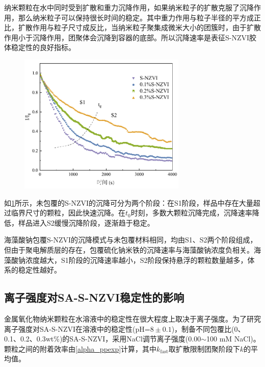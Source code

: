 纳米颗粒在水中同时受到扩散和重力沉降作用，如果纳米粒子的扩散克服了沉降作用，那么纳米粒子可以保持很长时间的稳定。其中重力作用与粒子半径的平方成正比，扩散作用与粒子尺寸成反比，当纳米粒子聚集成微米大小的团簇时，由于扩散作用小于沉降作用，团聚体会沉降到容器的底部。所以沉降速率是表征S-NZVI胶体稳定性的良好指标。

\begin{figure}[h]
    \centering
    \includegraphics[width=8cm]{figs/fig1.pdf}
    \label{fig01}
\end{figure}

如\cref{fig01}所示，未包覆的S-NZVI的沉降可分为两个阶段：在S1阶段，样品中存在大量超过临界尺寸的颗粒，因此快速沉降。在$t_0$时刻，多数大颗粒沉降完成，沉降速率降低，样品进入S2缓慢沉降阶段，逐渐趋于稳定。

海藻酸钠包覆S-NZVI的沉降模式与未包覆材料相同，均由S1、S2两个阶段组成，但由于聚电解质层的存在，包覆硫化钠米铁的沉降速率与海藻酸钠浓度负相关。海藻酸钠浓度越大，S1阶段的沉降速率越小，S2阶段保持悬浮的颗粒数量越多，体系的稳定性越好。

\subsection{离子强度对SA-S-NZVI稳定性的影响}

金属氧化物纳米颗粒在水溶液中的稳定性在很大程度上取决于离子强度。为了研究离子强度对SA-S-NZVI在溶液中的稳定性(pH=$8\pm 0.1$)，制备不同包覆比(0、0.1、0.2、0.3wt\%)的SA-S-NZVI，采用NaCl调节离子强度(0.00$\sim$100 mM NaCl)。颗粒之间的附着效率由\cref{alpha_ppexp}计算，其中$k_{\mathrm{fast}}$取扩散限制团聚阶段下$k$的平均值。

